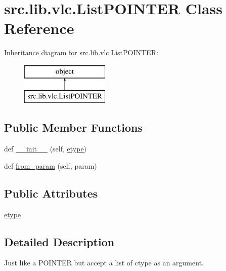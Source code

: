 \hypertarget{classsrc_1_1lib_1_1vlc_1_1ListPOINTER}{}\section{src.\+lib.\+vlc.\+List\+P\+O\+I\+N\+T\+E\+R Class Reference}
\label{classsrc_1_1lib_1_1vlc_1_1ListPOINTER}
Inheritance diagram for src.\+lib.\+vlc.\+List\+P\+O\+I\+N\+T\+E\+R\+:\begin{figure}[H]
\begin{center}
\leavevmode
\includegraphics[height=2.000000cm]{classsrc_1_1lib_1_1vlc_1_1ListPOINTER}
\end{center}
\end{figure}
\subsection*{Public Member Functions}
\begin{DoxyCompactItemize}
\item 
def \hyperlink{classsrc_1_1lib_1_1vlc_1_1ListPOINTER_a6d646058fba287e650308951321a120e}{\+\_\+\+\_\+init\+\_\+\+\_\+} (self, \hyperlink{classsrc_1_1lib_1_1vlc_1_1ListPOINTER_a844ada7c6d6500ba23542f63587c6c32}{etype})
\item 
def \hyperlink{classsrc_1_1lib_1_1vlc_1_1ListPOINTER_a31385a500d9ca4a866d53cda05639426}{from\+\_\+param} (self, param)
\end{DoxyCompactItemize}
\subsection*{Public Attributes}
\begin{DoxyCompactItemize}
\item 
\hyperlink{classsrc_1_1lib_1_1vlc_1_1ListPOINTER_a844ada7c6d6500ba23542f63587c6c32}{etype}
\end{DoxyCompactItemize}


\subsection{Detailed Description}
\begin{DoxyVerb}Just like a POINTER but accept a list of ctype as an argument.
\end{DoxyVerb}
 

